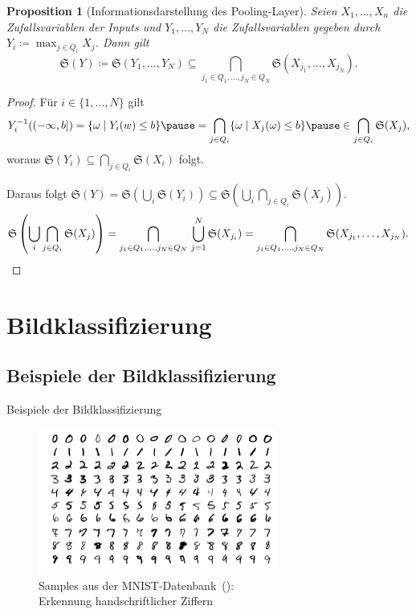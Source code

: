 \documentclass[envcountsect, smaller, aspectratio=149]{beamer}
\newtheorem{proposition}{Proposition}
\begin{document}
\begin{frame}
    \begin{proposition}[Informationsdarstellung des Pooling-Layer]
        Seien $X_1,\dots,X_n$ die Zufallsvariablen der Inputs und $Y_1,\dots,Y_N$ die Zufallsvariablen gegeben durch
        $Y_i\coloneqq \max_{j \in Q_i} X_j$.
        Dann gilt
        \[
          \mathfrak{S}(Y) \coloneqq \mathfrak{S}(Y_1,\dots,Y_N)\subseteq \bigcap_{j_1\in Q_1,\dots, j_N\in Q_N} \mathfrak{S}(X_{j_1}, \dots, X_{j_N})  .
        \]
    \end{proposition}
    \begin{proof}
        \pause Für $i\in\{1,\dots,N\}$ gilt \[
            Y_i^{-1}((-\infty, b]) = \{ \omega \mid Y_i(w) \leq b \}
            \pause = \bigcap_{j\in Q_i} \{\omega\mid X_j(\omega) \leq b\} \pause \in \bigcap_{j\in Q_i} \mathfrak{S}(X_j), \]
            woraus $\mathfrak{S}(Y_i) \subseteq \bigcap_{j\in Q_i} \mathfrak{S}(X_i)$ folgt.
            
            \pause Daraus folgt $\mathfrak{S}(Y) = \mathfrak{S}\left(\bigcup_{i}\mathfrak{S}(Y_i)\right)\subseteq \mathfrak{S}\left( \bigcup_i \bigcap_{j\in Q_i} \mathfrak{S}(X_j) \right)$.
            \pause
            \[
                \mathfrak{S}\left( \bigcup_i \bigcap_{j\in Q_i} \mathfrak{S}(X_j) \right) = \bigcap_{j_1\in Q_1,\dots, j_N\in Q_N} \,\bigcup_{j=1}^N \mathfrak{S}(X_{j_i})
                = \bigcap_{j_1\in Q_1,\dots, j_N\in Q_N} \mathfrak{S}(X_{j_1},\dots,X_{j_N}).
                \qedhere
            \]
    \end{proof}
\end{frame}

\section{Bildklassifizierung}

\subsection{Beispiele der Bildklassifizierung}

\begin{frame}{Beispiele der Bildklassifizierung}
    \begin{figure}
        \includegraphics[width=0.7\textwidth]{MnistExamples.png}
        \caption{Samples aus der MNIST-Datenbank~(\cite{lecun2010mnist}):\\
        Erkennung handschriftlicher Ziffern}
    \end{figure}
\end{frame}
\end{document}

